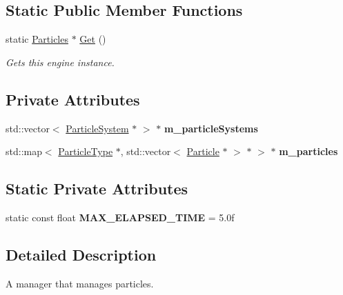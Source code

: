 \subsection*{Static Public Member Functions}
\begin{DoxyCompactItemize}
\item 
static \hyperlink{class_flounder_1_1_particles}{Particles} $\ast$ \hyperlink{class_flounder_1_1_particles_a64689324a6a1b05df2a58aa403b7d49c}{Get} ()
\begin{DoxyCompactList}\small\item\em Gets this engine instance. \end{DoxyCompactList}\end{DoxyCompactItemize}
\subsection*{Private Attributes}
\begin{DoxyCompactItemize}
\item 
\mbox{\label{class_flounder_1_1_particles_ac06d0de0ffc74a6641e55bdaad64e82d}} 
std\+::vector$<$ \hyperlink{class_flounder_1_1_particle_system}{Particle\+System} $\ast$ $>$ $\ast$ {\bfseries m\+\_\+particle\+Systems}
\item 
\mbox{\label{class_flounder_1_1_particles_accb8642e9b778c3bfaebbc6a6d9b6040}} 
std\+::map$<$ \hyperlink{class_flounder_1_1_particle_type}{Particle\+Type} $\ast$, std\+::vector$<$ \hyperlink{class_flounder_1_1_particle}{Particle} $\ast$ $>$ $\ast$ $>$ $\ast$ {\bfseries m\+\_\+particles}
\end{DoxyCompactItemize}
\subsection*{Static Private Attributes}
\begin{DoxyCompactItemize}
\item 
\mbox{\label{class_flounder_1_1_particles_a5a667ee33e1ec10665da113cd0a2fdf1}} 
static const float {\bfseries M\+A\+X\+\_\+\+E\+L\+A\+P\+S\+E\+D\+\_\+\+T\+I\+ME} = 5.\+0f
\end{DoxyCompactItemize}


\subsection{Detailed Description}
A manager that manages particles. 



